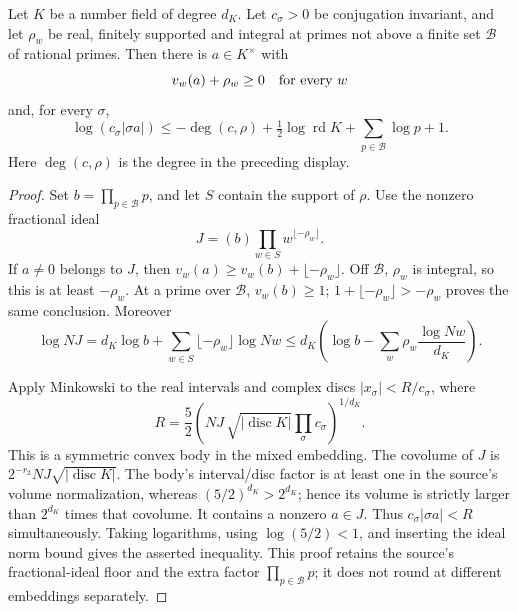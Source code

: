 \begin{srlemma}
\label{lem:ftb-round-flat-line}
Let \(K\) be a number field of degree \(d_K\).
Let \(c_\sigma>0\) be conjugation invariant, and let \(\rho_w\)
be real, finitely supported and integral at primes not above a
finite set \(\mathcal B\) of rational primes.
Then there is \(a\in K^\times\) with
\[
 v_w(a)+\rho_w\ge0\quad\hbox{for every }w
\]
and, for every \(\sigma\),
\[
 \log(c_\sigma|\sigma a|)
 \le-\deg(c,\rho)+\tfrac12\log\operatorname{rd}K
                      +\sum_{p\in\mathcal B}\log p+1 .
\]
Here \(\deg(c,\rho)\) is the degree in the preceding display.
\end{srlemma}
\begin{proof}
Set \(b=\prod_{p\in\mathcal B}p\), and let \(S\) contain the support
of \(\rho\).
Use the nonzero fractional ideal
\[
                 J=(b)\prod_{w\in S}w^{\lfloor-\rho_w\rfloor}.
\]
If \(a\ne0\) belongs to \(J\), then
\(v_w(a)\ge v_w(b)+\lfloor-\rho_w\rfloor\).
Off \(\mathcal B\), \(\rho_w\) is integral, so this is at least
\(-\rho_w\).
At a prime over \(\mathcal B\), \(v_w(b)\ge1\);
\(1+\lfloor-\rho_w\rfloor>-\rho_w\) proves the same conclusion.
Moreover
\[
 \log NJ
  =d_K\log b+\sum_{w\in S}\lfloor-\rho_w\rfloor\log Nw
  \le d_K\left(\log b-
               \sum_w\rho_w\frac{\log Nw}{d_K}\right).
\]

Apply Minkowski to the real intervals and complex discs
\(|x_\sigma|<R/c_\sigma\), where
\[
 R=\frac52
       \left(NJ\,\sqrt{|\operatorname{disc}K|}
                   \prod_\sigma c_\sigma\right)^{1/d_K}.
\]
This is a symmetric convex body in the mixed embedding.
The covolume of \(J\) is
\(2^{-r_2}NJ\sqrt{|\operatorname{disc}K|}\).
The body's interval/disc factor is at least one in the source's
volume normalization, whereas \((5/2)^{d_K}>2^{d_K}\);
hence its volume is strictly larger than \(2^{d_K}\) times that
covolume.
It contains a nonzero \(a\in J\).
Thus \(c_\sigma|\sigma a|<R\) simultaneously.
Taking logarithms, using \(\log(5/2)<1\), and inserting the ideal
norm bound gives the asserted inequality.
This proof retains the source's fractional-ideal floor and the
extra factor \(\prod_{p\in\mathcal B}p\); it does not round at
different embeddings separately.
\end{proof}

